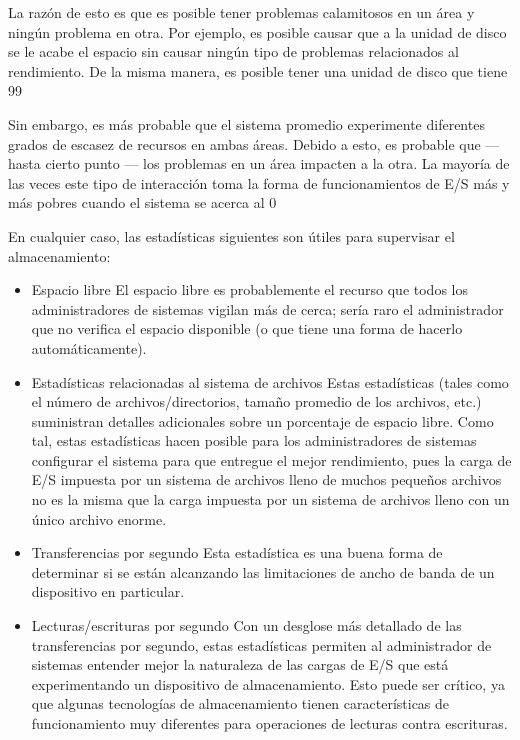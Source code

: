 \documentclass[12pt]{article}
\begin{document}
La razón de esto es que es posible tener problemas calamitosos en un área y ningún problema en otra. Por ejemplo, es posible causar que a la unidad de disco se le acabe el espacio sin causar ningún tipo de problemas relacionados al rendimiento. De la misma manera, es posible tener una unidad de disco que tiene 99%

Sin embargo, es más probable que el sistema promedio experimente diferentes grados de escasez de recursos en ambas áreas. Debido a esto, es probable que — hasta cierto punto — los problemas en un área impacten a la otra. La mayoría de las veces este tipo de interacción toma la forma de funcionamientos de E/S más y más pobres cuando el sistema se acerca al 0%

En cualquier caso, las estadísticas siguientes son útiles para supervisar el almacenamiento:

\begin{itemize}
\item Espacio libre
El espacio libre es probablemente el recurso que todos los administradores de sistemas vigilan más de cerca; sería raro el administrador que no verifica el espacio disponible (o que tiene una forma de hacerlo automáticamente).

\item Estadísticas relacionadas al sistema de archivos
Estas estadísticas (tales como el número de archivos/directorios, tamaño promedio de los archivos, etc.) suministran detalles adicionales sobre un porcentaje de espacio libre. Como tal, estas estadísticas hacen posible para los administradores de sistemas configurar el sistema para que entregue el mejor rendimiento, pues la carga de E/S impuesta por un sistema de archivos lleno de muchos pequeños archivos no es la misma que la carga impuesta por un sistema de archivos lleno con un único archivo enorme.

\item Transferencias por segundo
Esta estadística es una buena forma de determinar si se están alcanzando las limitaciones de ancho de banda de un dispositivo en particular.

\item Lecturas/escrituras por segundo
Con un desglose más detallado de las transferencias por segundo, estas estadísticas permiten al administrador de sistemas entender mejor la naturaleza de las cargas de E/S que está experimentando un dispositivo de almacenamiento. Esto puede ser crítico, ya que algunas tecnologías de almacenamiento tienen características de funcionamiento muy diferentes para operaciones de lecturas contra escrituras.
\end{itemize}
\end{document}
